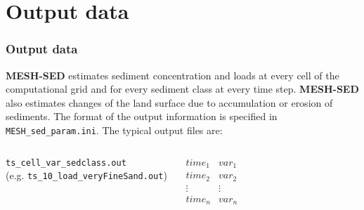 \documentclass{beamer}
\newcommand{\ms}{\textbf{MESH-SED} }
\begin{document}
\section{Output data}
\begin{frame}\frametitle{Output data}
\ms estimates sediment concentration and loads at every cell of the computational grid and for every sediment class at every time step. \ms also estimates changes of the land surface due to accumulation or erosion of sediments. The format of the output information is specified in \texttt{MESH\_sed\_param.ini}. The typical output files are:
\vspace*{-7mm}
\begin{columns}
{\tiny
\begin{center}
\texttt{ts\_cell\_var\_sedclass.out}\\
(e.g. \texttt{ts\_10\_load\_veryFineSand.out})
\end{center}
\vspace*{-2mm}
\begin{minipage}[t]{\linewidth}
$$
\begin{matrix}
time_1 & var_1 \\
time_2 & var_2 \\
\vdots & \vdots \\
time_n & var_n \\
\end{matrix}
$$
\end{minipage}

}
\end{columns}
\end{frame}
\end{document}
